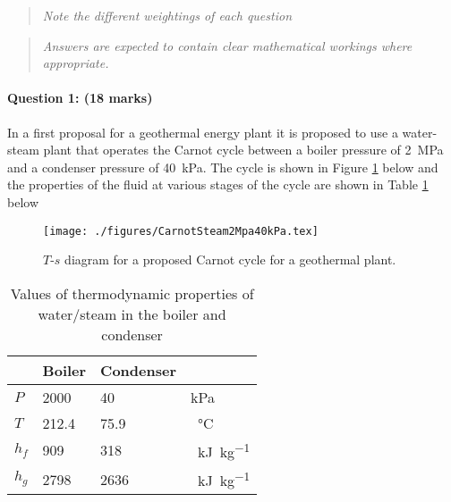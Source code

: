 \documentclass[a4paper,12pt,fleqn]{article}
\begin{document}
\begin{quote}
\begin{center}
\textit{Note the different weightings of each question}
\end{center}
\end{quote}

\begin{quote}
\begin{center}
\textit{Answers are expected to contain clear mathematical workings where appropriate.}
\end{center}
\end{quote}

\bigskip

\newpage
\paragraph{\textbf{Question 1: (18 marks)}}
In a first proposal for a geothermal energy plant it is proposed to use a water-steam plant that operates the Carnot cycle between a boiler pressure of \SI{2}{\mega\pascal} and a condenser pressure of \SI{40}{kPa}. The cycle is shown in Figure \ref{figure:q1} below and the properties of the fluid at various stages of the cycle are shown in Table \ref{table:q1} below

\begin{figure}[h]
\centering
\texttt{[image: ./figures/CarnotSteam2Mpa40kPa.tex]}
\caption{$T$-$s$ diagram for a proposed Carnot cycle for a geothermal plant.}
\label{figure:q1}
\end{figure}

\begin{table}[h]
\caption{Values of thermodynamic properties of water/steam in the boiler and condenser}  %
\centering %
\begin{tabular}{l l l l} %
\hline\hline %
 & Boiler & Condenser &  \\ [0.5ex] %
\hline %
$P$ & 2000 & 40 & kPa \\ %
$T$ & 212.4 & 75.9 & \SI{}{\celsius} \\
$h_f$ & 909 & 318 & \SI{}{\kilo\joule\per\kg} \\
$h_g$ & 2798 & 2636 & \SI{}{\kilo\joule\per\kg}  \\ [1ex] %
\hline %
\end{tabular}
\label{table:q1} %
\end{table}
\end{document}

